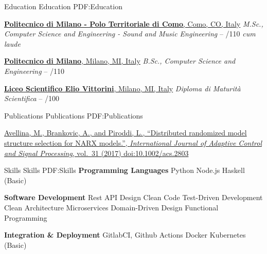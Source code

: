 \documentclass[a4paper,MMMyyyy,nonstopmode]{simpleresumecv}
\newcommand{\DoubleBigGap}{\BigGap\BigGap}
\begin{document}
\begin{Body}
    \Section
    {Education}
    {Education}
    {PDF:Education}

      \Entry
        \href{http://www.polo-como.polimi.it}{\textbf{Politecnico di Milano - Polo Territoriale di Como}, Como, CO, Italy}
        \Gap
        \textit{M.Sc., Computer Science and Engineering - Sound and Music Engineering}
          \hfill
           -- 
        /110 \textit{cum laude}

      \DoubleBigGap

      \Entry
        \href{https://www.polimi.it}{\textbf{Politecnico di Milano}, Milano, MI, Italy}
        \Gap
        \textit{B.Sc., Computer Science and Engineering}
          \hfill
           -- 
        /110

      \DoubleBigGap

      \Entry
        \href{https://www.eliovittorini.edu.it/}{\textbf{Liceo Scientifico Elio Vittorini}, Milano, MI, Italy}
        \Gap
        \textit{Diploma di Maturità Scientifica}
          \hfill
           -- 
        /100

    \Section
    {Publications}
    {Publications}
    {PDF:Publications}

    \href{https://doi.org/10.1002/acs.2803}
    {\underline{Avellina, M.}, Brankovic, A., and Piroddi, L.,
    ``Distributed randomized model structure selection for NARX models.'',
    \textit{International Journal of Adaptive Control and Signal Processing},
    vol.~31
    (2017)
    doi:10.1002/acs.2803}

    \Section
    {Skills}
    {Skills}
    {PDF:Skills}
      \Entry
        \textbf{Programming Languages}
        \Gap
        \BulletItem
          Python
        \BulletItem
          Node.js
        \BulletItem
          Haskell (Basic)

      \BigGap

      \Entry
        \textbf{Software Development}
        \Gap
        \BulletItem
          Rest API Design
        \BulletItem
          Clean Code
        \BulletItem
          Test-Driven Development
        \BulletItem
          Clean Architecture
        \BulletItem
          Microservices
        \BulletItem
          Domain-Driven Design
        \BulletItem
          Functional Programming

      \BigGap

      \Entry
        \textbf{Integration \& Deployment}
        \Gap
        \BulletItem
          GitlabCI, Github Actions
        \BulletItem
          Docker
        \BulletItem
          Kubernetes (Basic)


\end{Body}
\end{document}
